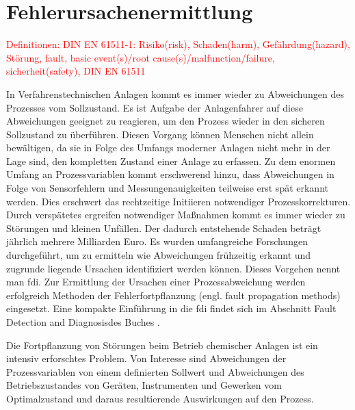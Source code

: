 \chapter{Fehlerursachenermittlung} \label{ch:fehlerfortpfl}
\textcolor{red}{Definitionen: DIN EN 61511-1: Risiko(risk), Schaden(harm), Gef\"ahrdung(hazard), St\"orung, fault, basic event(s)/root cause(s)/malfunction/failure, sicherheit(safety), DIN EN 61511 }

In Verfahrenstechnischen Anlagen kommt es immer wieder zu Abweichungen des Prozesses vom Sollzustand. Es ist Aufgabe der Anlagenfahrer auf diese Abweichungen geeignet zu reagieren, um den Prozess wieder in den sicheren Sollzustand zu \"uberf\"uhren. Diesen Vorgang k\"onnen Menschen nicht allein bew\"altigen, da sie in Folge des Umfangs moderner Anlagen nicht mehr in der Lage sind, den kompletten Zustand einer Anlage zu erfassen. Zu dem enormen Umfang an Prozessvariablen kommt erschwerend hinzu, dass Abweichungen in Folge von Sensorfehlern und Messungenauigkeiten teilweise erst sp\"at erkannt werden. Dies erschwert das rechtzeitige Initiieren notwendiger Prozesskorrekturen. Durch versp\"atetes ergreifen notwendiger Ma\ss{}nahmen kommt es immer wieder zu St\"orungen und kleinen Unf\"allen. Der dadurch entstehende Schaden betr\"agt j\"ahrlich mehrere Milliarden Euro. Es wurden umfangreiche Forschungen durchgef\"uhrt, um zu ermitteln wie Abweichungen fr\"uhzeitig erkannt und zugrunde liegende Ursachen identifiziert werden k\"onnen. Dieses Vorgehen nennt man \ac{fdi}. Zur Ermittlung der Ursachen einer Prozessabweichung werden erfolgreich Methoden der Fehlerfortpflanzung (engl. fault propagation methods) eingesetzt.  \cite[S. 2]{Venkatasubramanian_2003} \newline
Eine kompakte Einf\"uhrung in die \ac{fdi} findet sich im Abschnitt \glqq Fault Detection and Diagnosis\grqq { }des Buches  \cite[S. 417 ff.]{Baillieul_2015}.

Die Fortpflanzung von St\"orungen beim Betrieb chemischer Anlagen ist ein intensiv erforschtes Problem. Von Interesse sind Abweichungen der Prozessvariablen von einem definierten Sollwert und Abweichungen des Betriebszustandes von Ger\"aten, Instrumenten und Gewerken vom Optimalzustand und daraus resultierende Auswirkungen auf den Prozess.

